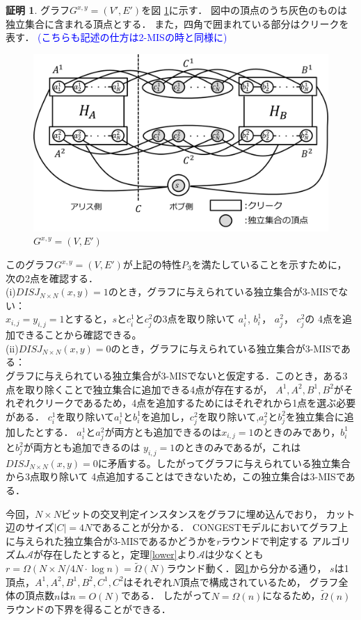 \documentclass[12pt]{thesis}
\newcommand{\Izumi}[1]{\textcolor{blue}{(#1)}}
\newcommand{\CONGEST}{\textsf{CONGEST}}
\theoremstyle{definition}
\newtheorem*{prf*}{証明}
\begin{document}
\begin{prf*}
グラフ$G^{x, y} = (V', E')$を図 \ref{3_G(x,y)}に示す．
図中の頂点のうち灰色のものは独立集合に含まれる頂点とする．
また，四角で囲まれている部分はクリークを表す．
\Izumi{こちらも記述の仕方は2-MISの時と同様に}

\begin{figure}[ht]
\begin{center}
\includegraphics[width=120mm]{3_Gxy.png}
\end{center}
\caption{$G^{x, y} = (V, E')$}
\label{3_G(x,y)}
\end{figure}

このグラフ$G^{x, y} = (V, E')$が上記の特性$P_{3}$を満たしていることを示すために，次の2点を確認する． \\
(i)$DISJ_{N \times N} (x, y) = 1$のとき，グラフに与えられている独立集合が3-MISでない： \\
$x_{i, j} = y_{i, j} =1$とすると，$s$と$c_{i}^{1}$と$c_{j}^{2}$の3点を取り除いて
$a_{i}^{1}$, $b_{i}^{1}$， $a_{j}^{2}$， $c_{j}^{2}$の
4点を追加できることから確認できる。 \\
(ii)$DISJ_{N \times N} (x, y) = 0$のとき，グラフに与えられている独立集合が3-MISである： \\ 
グラフに与えられている独立集合が3-MISでないと仮定する．このとき，ある3点を取り除くことで独立集合に追加できる4点が存在するが，
$A^{1}, A^{2}, B^{1}, B^{2}$がそれぞれクリークであるため，4点を追加するためにはそれぞれから1点を選ぶ必要がある．
$c_{i}^{1}$を取り除いて$a_{i}^{1}$と$b_{i}^{1}$を追加し，$c_{j}^{2}$を取り除いて,$a_{j}^{2}$と$b_{j}^{2}$を独立集合に追加したとする．
$a_{i}^{1}$と$a_{j}^{2}$が両方とも追加できるのは$x_{i, j} = 1$のときのみであり，$b_{i}^{1}$と$b_{j}^{2}$が両方とも追加できるのは
$y_{i, j} = 1$のときのみであるが，これは$DISJ_{N \times N} (x, y) = 0$に矛盾する。したがってグラフに与えられている独立集合から3点取り除いて
4点追加することはできないため，この独立集合は3-MISである．

今回，$N \times N$ビットの交叉判定インスタンスをグラフに埋め込んでおり，
カット辺のサイズ$|C| = 4N$であることが分かる．
{\CONGEST}モデルにおいてグラフ上に与えられた独立集合が3-MISであるかどうかを$r$ラウンドで判定する
アルゴリズム$\mathcal{A}$が存在したとすると，定理\ref{lower}より$\mathcal{A}$は少なくとも
$r = \Omega (N \times N/ 4N \cdot \log n) = \tilde{\Omega}(N)$ラウンド動く．図\ref{3_G(x,y)}から分かる通り，
$s$は1頂点，$A^{1}, A^{2}, B^{1}, B^{2}, C^{1}, C^{2}$はそれぞれ$N$頂点で構成されているため，
グラフ全体の頂点数$n$は$n = O(N)$である．
したがって$N = \Omega(n)$になるため，$\tilde{\Omega}(n)$ラウンドの下界を得ることができる．
\end{prf*}
\end{document}
